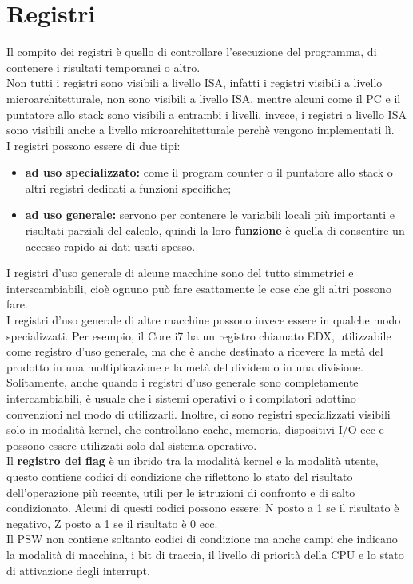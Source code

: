 \documentclass[12pt]{report}
\begin{document}
		\section{Registri}
		Il compito dei registri è quello di controllare l'esecuzione del programma, di contenere i risultati temporanei o altro. \\
		Non tutti i registri sono visibili a livello ISA, infatti i registri visibili a livello microarchitetturale, non sono visibili a livello ISA, mentre alcuni come il PC e il puntatore allo stack sono visibili a entrambi i livelli, invece, i registri a livello ISA sono visibili anche a livello microarchitetturale perchè vengono implementati lì.\\
		I registri possono essere di due tipi:
		\begin{itemize}
			\item \textbf{ad uso specializzato:} come il program counter o il puntatore allo stack o altri registri dedicati a funzioni specifiche;
			\item \textbf{ad uso generale:} servono per contenere le variabili locali più importanti e risultati parziali del calcolo, quindi la loro \textbf{funzione} è quella di consentire un accesso rapido ai dati usati spesso.
		\end{itemize}
		I registri d'uso generale di alcune macchine sono del tutto simmetrici e interscambiabili, cioè ognuno può fare esattamente le cose che gli altri possono fare. \\
		I registri d'uso generale di altre macchine possono invece essere in qualche modo specializzati. Per esempio, il Core i7 ha un registro chiamato EDX, utilizzabile come registro d'uso generale, ma che è anche destinato a ricevere la metà del prodotto in una moltiplicazione e la metà del dividendo in una divisione. \\
		Solitamente, anche quando i registri d'uso generale sono completamente intercambiabili, è usuale che i sistemi operativi o i compilatori adottino convenzioni nel modo di utilizzarli.
		Inoltre, ci sono registri specializzati visibili solo in modalità kernel, che controllano cache, memoria, dispositivi I/O ecc e possono essere utilizzati solo dal sistema operativo. \\
		Il \textbf{registro dei flag} è un ibrido tra la modalità kernel e la modalità utente, questo contiene codici di condizione che riflettono lo stato del risultato dell'operazione più recente, utili per le istruzioni di confronto e di salto condizionato. Alcuni di questi codici possono essere: N posto a 1 se il risultato è negativo, Z posto a 1 se il risultato è 0 ecc. \\
		Il PSW non contiene soltanto codici di condizione ma anche campi che indicano la modalità di macchina, i bit di traccia, il livello di priorità della CPU e lo stato di attivazione degli interrupt.
\end{document}
